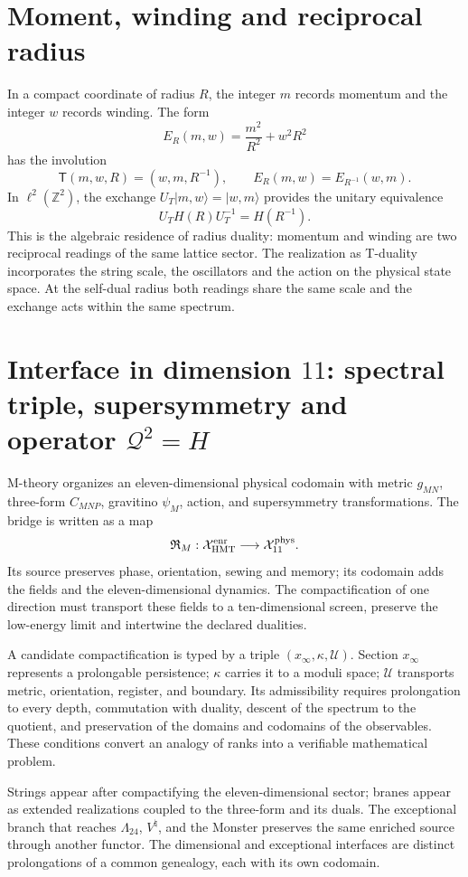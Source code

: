 \section{Moment, winding and reciprocal radius}

In a compact coordinate of radius \(R\), the integer \(m\) records momentum and
the integer \(w\) records winding. The form
\[
 E_R(m,w)=\frac{m^2}{R^2}+w^2R^2
\]
has the involution
\[
 \mathsf T(m,w,R)=(w,m,R^{-1}),
 \qquad
 E_R(m,w)=E_{R^{-1}}(w,m).
\]
In \(\ell^2(\mathbb Z^2)\), the exchange
\(U_T\lvert m,w\rangle=\lvert w,m\rangle\) provides the unitary
equivalence
\[
 U_TH(R)U_T^{-1}=H(R^{-1}).
\]
This is the algebraic residence of radius duality: momentum and
winding are two reciprocal readings of the same lattice sector. The
realization as T-duality incorporates the string scale, the oscillators and
the action on the physical state space. At the self-dual radius both
readings share the same scale and the exchange acts within the same
spectrum.

\section{Interface in dimension \(11\): spectral triple, supersymmetry and operator \(\mathcal Q^2=H\)}

M-theory organizes an eleven-dimensional physical codomain with metric
\(g_{MN}\), three-form \(C_{MNP}\), gravitino \(\psi_M\), action, and
supersymmetry transformations. The bridge is written as a map
\[
 \mathfrak R_M:\mathcal X_{\rm HMT}^{\rm enr}
 \longrightarrow\mathcal X_{11}^{\rm phys}.
\]
Its source preserves phase, orientation, sewing and memory; its codomain adds
the fields and the eleven-dimensional dynamics. The compactification of one
direction must transport these fields to a ten-dimensional screen,
preserve the low-energy limit and intertwine the declared dualities.

A candidate compactification is typed by a triple
\((x_\infty,\kappa,\mathcal U)\). Section \(x_\infty\) represents a
prolongable persistence; \(\kappa\) carries it to a moduli space;
\(\mathcal U\) transports metric, orientation, register, and boundary. Its
admissibility requires prolongation to every depth, commutation with
duality, descent of the spectrum to the quotient, and preservation of the domains and
codomains of the observables. These conditions convert an analogy of
ranks into a verifiable mathematical problem.

Strings appear after compactifying the eleven-dimensional sector;
branes appear as extended realizations coupled to the three-form and
its duals. The exceptional branch that reaches \(\Lambda_{24}\),
\(V^\natural\), and the Monster preserves the same enriched source through
another functor. The dimensional and exceptional interfaces are distinct
prolongations of a common genealogy, each with its own codomain.

